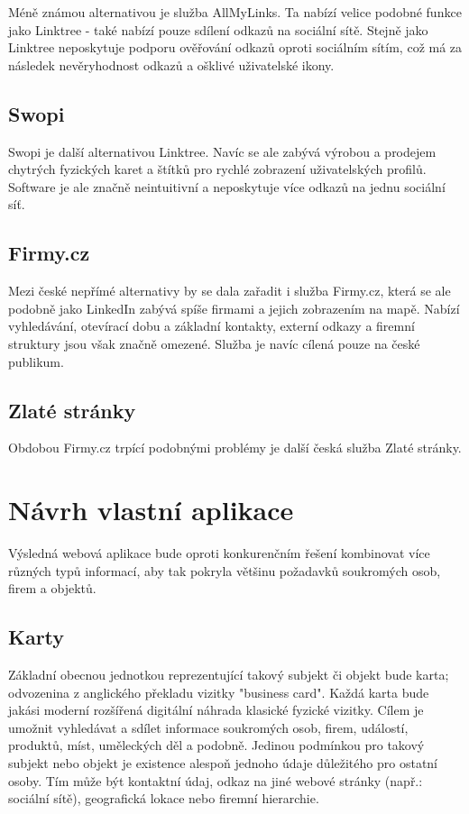 	Méně známou alternativou je služba AllMyLinks.
	Ta nabízí velice podobné funkce jako Linktree - také nabízí pouze sdílení odkazů na sociální sítě.
	Stejně jako Linktree neposkytuje podporu ověřování odkazů oproti sociálním sítím, což má za následek
	nevěryhodnost odkazů a ošklivé uživatelské ikony.

	\subsection{Swopi}

	Swopi je další alternativou Linktree.
	Navíc se ale zabývá výrobou a prodejem chytrých fyzických karet a štítků pro rychlé zobrazení uživatelských profilů.
	Software je ale značně neintuitivní a neposkytuje více odkazů na jednu sociální síť.

	\subsection{Firmy.cz}

	Mezi české nepřímé alternativy by se dala zařadit i služba Firmy.cz, která se ale podobně jako LinkedIn zabývá
	spíše firmami a jejich zobrazením na mapě.
	Nabízí vyhledávání, otevírací dobu a základní kontakty, externí odkazy a firemní struktury jsou však značně omezené.
	Služba je navíc cílená pouze na české publikum.

	\subsection{Zlaté stránky}

	Obdobou Firmy.cz trpící podobnými problémy je další česká služba Zlaté stránky.

\section{Návrh vlastní aplikace}

Výsledná webová aplikace bude oproti konkurenčním řešení kombinovat více různých typů informací, aby tak pokryla
většinu požadavků soukromých osob, firem a objektů.

	\subsection{Karty}

	Základní obecnou jednotkou reprezentující takový subjekt či objekt bude karta; odvozenina z anglického překladu vizitky "business card".
	Každá karta bude jakási moderní rozšířená digitální náhrada klasické fyzické vizitky.
	Cílem je umožnit vyhledávat a sdílet informace soukromých osob, firem, událostí, produktů, míst, uměleckých děl a podobně.
	Jedinou podmínkou pro takový subjekt nebo objekt je existence alespoň jednoho údaje důležitého pro ostatní osoby.
	Tím může být kontaktní údaj, odkaz na jiné webové stránky (např.: sociální sítě), geografická lokace nebo
	firemní hierarchie.

